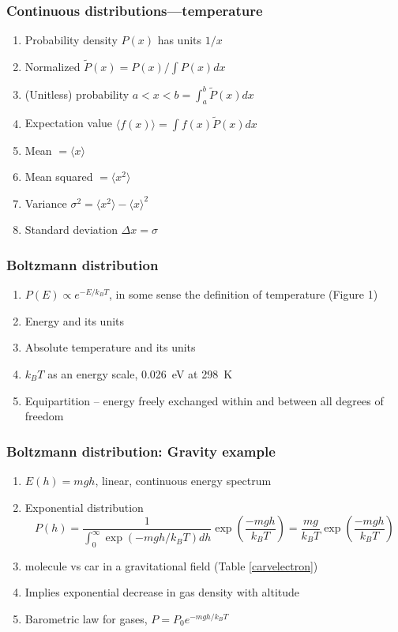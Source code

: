 \documentclass[11pt]{article}
\begin{document}
\subsubsection{Continuous distributions---temperature}
\label{sec:orgb043fcd}
\begin{enumerate}
\item Probability density \(P(x)\) has units \(1/x\)
\item Normalized \(\tilde P(x) = P(x)/\int P(x) dx\)
\item (Unitless) probability \(a < x < b = \int_a^b \tilde P(x) dx\)
\item Expectation value \(\langle f(x) \rangle = \int f(x) \tilde P(x) dx\)
\item Mean \(= \langle x \rangle\)
\item Mean squared \(= \langle x^2 \rangle\)
\item Variance \(\sigma^2=\langle x^2 \rangle - \langle x \rangle^2\)
\item Standard deviation \(\Delta x = \sigma\)
\end{enumerate}

\subsubsection{Boltzmann distribution}
\label{sec:org25a7190}
\begin{enumerate}
\item \(P(E) \propto e^{-E/k_BT}\), in some sense the definition of temperature (Figure 1)
\item Energy and its units
\item Absolute temperature and its units
\item \(k_BT\) as an energy scale, \SI{0.026}{eV} at \SI{298}{K}
\item Equipartition -- energy freely exchanged within and between all degrees of freedom
\end{enumerate}
\subsubsection{Boltzmann distribution: Gravity example}
\label{sec:org8b513c9}
\begin{enumerate}
\item \(E(h)=mgh\), linear, continuous energy spectrum
\item Exponential distribution
\[P(h) = \frac{1}{\int_0^\infty \exp\left(-mgh/k_BT\right)dh }\exp\left(\frac{-mgh}{k_BT}\right )  =  \frac{mg}{k_BT}\exp\left(\frac{-mgh}{k_BT}\right)\]
\item molecule vs car in a gravitational field (Table \ref{carvelectron})
\item Implies exponential decrease in gas density with altitude
\item Barometric law for gases, \(P=P_0e^{-mgh/k_BT}\)
\end{enumerate}
\end{document}
